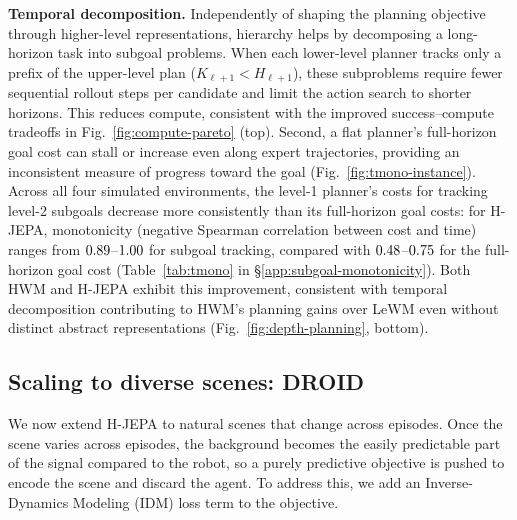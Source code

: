 \textbf{Temporal decomposition.}
Independently of shaping the planning objective through higher-level
representations, hierarchy helps by decomposing a long-horizon task into
subgoal problems. When each lower-level planner tracks only a prefix of the
upper-level plan ($K_{\ell+1}<H_{\ell+1}$), these subproblems require fewer sequential rollout steps per candidate
and limit the action search to shorter horizons. This reduces compute,
consistent with the improved success--compute tradeoffs in
Fig.~\ref{fig:compute-pareto} (top).
Second, a flat planner's full-horizon goal cost can stall or increase even along
expert trajectories, providing an inconsistent measure of progress toward the
goal (Fig.~\ref{fig:tmono-instance}).
Across all four simulated environments, the level-1 planner's costs for tracking
level-2 subgoals decrease more consistently than its full-horizon goal costs:
for H-JEPA, monotonicity (negative Spearman correlation between cost and time)
ranges from $0.89$--$1.00$ for subgoal tracking,
compared with $0.48$--$0.75$ for the full-horizon goal cost
(Table~\ref{tab:tmono} in \S\ref{app:subgoal-monotonicity}).
Both HWM and H-JEPA exhibit this improvement, consistent with temporal
decomposition contributing to HWM's planning gains over LeWM even without
distinct abstract representations (Fig.~\ref{fig:depth-planning}, bottom).

\subsection{Scaling to diverse scenes: DROID}
\label{sec:droid}
We now extend H-JEPA to natural scenes that change across episodes. Once the scene varies across episodes, the background becomes the easily predictable part of the signal compared to the robot, so a purely predictive objective is pushed to encode the scene and discard the agent. To address this, we add an Inverse-Dynamics Modeling (IDM) loss term to the objective.

